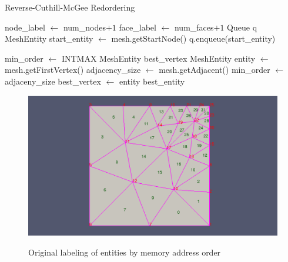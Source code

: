\documentclass{article}
\begin{document}
		
\begin{algorithm}
\caption{Reverse-Cuthill-McGee Redordering}\label{RCM}
\begin{algorithmic}
	\State node\_label $\gets$ num\_nodes$ + 1$
	\State face\_label $\gets$ num\_faces$ + 1$
	\State Queue q
	\State MeshEntity start\_entity $\gets$ mesh.getStartNode()
	\State q.enqueue(start\_entity)

	\EndWhile


\EndProcedure
\State

	\State{}
	\State min\_order $\gets$ INTMAX
	\State MeshEntity best\_vertex
	\State MeshEntity entity $\gets$ mesh.getFirstVertex()
			\State adjacency\_size $\gets$ mesh.getAdjacent()
				\State min\_order $\gets$ adjaceny\_size
				\State best\_vertex $\gets$ entity
			\EndIf
		\EndIf
	\EndWhile
	\State\Return best\_entity
\EndProcedure

\end{algorithmic}
\end{algorithm}

\begin{figure}[h]
\caption{Original labeling of entities by memory address order}
{\includegraphics[width = 15cm ]{pre_b}}
\centering
\end{figure}
\end{document}
